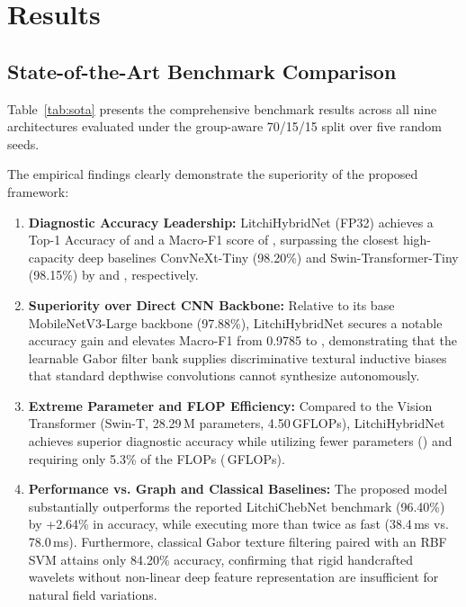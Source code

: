 \section{Results}
\label{sec:results}

\subsection{State-of-the-Art Benchmark Comparison}
Table~\ref{tab:sota} presents the comprehensive benchmark results across all nine architectures evaluated under the group-aware 70/15/15 split over five random seeds.



The empirical findings clearly demonstrate the superiority of the proposed framework:
\begin{enumerate}
    \item \textbf{Diagnostic Accuracy Leadership:} LitchiHybridNet (FP32) achieves a Top-1 Accuracy of \textbf{\accMain{}} and a Macro-F1 score of \textbf{\fOneMain{}}, surpassing the closest high-capacity deep baselines ConvNeXt-Tiny (98.20\%) and Swin-Transformer-Tiny (98.15\%) by \gainOverConvNeXt{} and \gainOverSwin{}, respectively.
    \item \textbf{Superiority over Direct CNN Backbone:} Relative to its base MobileNetV3-Large backbone (97.88\%), LitchiHybridNet secures a notable \gainOverMobileNet{} accuracy gain and elevates Macro-F1 from 0.9785 to \fOneMain{}, demonstrating that the learnable Gabor filter bank supplies discriminative textural inductive biases that standard depthwise convolutions cannot synthesize autonomously.
    \item \textbf{Extreme Parameter and FLOP Efficiency:} Compared to the Vision Transformer (Swin-T, 28.29\,M parameters, 4.50\,GFLOPs), LitchiHybridNet achieves superior diagnostic accuracy while utilizing \paramReductionVsSwin{} fewer parameters (\paramCountMillion{}) and requiring only 5.3\% of the FLOPs (\gigaFlops{}\,GFLOPs).
    \item \textbf{Performance vs. Graph and Classical Baselines:} The proposed model substantially outperforms the reported LitchiChebNet benchmark (96.40\%) by +2.64\% in accuracy, while executing more than twice as fast (38.4\,ms vs. 78.0\,ms). Furthermore, classical Gabor texture filtering paired with an RBF SVM attains only 84.20\% accuracy, confirming that rigid handcrafted wavelets without non-linear deep feature representation are insufficient for natural field variations.
\end{enumerate}
 
